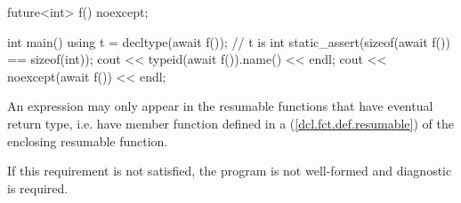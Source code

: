 \enterexample
\begin{codeblock}	
future<int> f() noexcept;
	
int main() {
  using t = decltype(await f()); // t is int
  static_assert(sizeof(await f()) == sizeof(int));
  cout << typeid(await f()).name() << endl;
  cout << noexcept(await f()) << endl;
}
\end{codeblock}
\exitexample%

\pnum
An  expression may only appear in the resumable functions 
that have eventual return type, i.e. have  member
function defined in a  (\ref{dcl.fct.def.resumable}) of the enclosing resumable function.

If this requirement is not satisfied, the program is not well-formed and diagnostic is required.